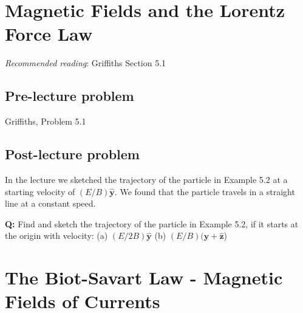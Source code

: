 \documentclass[
  letterpaper,
  DIV=11,
  numbers=noendperiod]{scrreprt}
\begin{document}

\chapter{Magnetic Fields and the Lorentz Force
Law}\label{magnetic-fields-and-the-lorentz-force-law}

\newcommand{\l}{\mathrm{\mathbf{l}}}
\newcommand{\E}{\mathrm{\mathbf{E}}}
\newcommand{\F}{\mathrm{\mathbf{F}}}
\newcommand{\r}{\mathrm{\mathbf{r}}}

\newcommand{\x}{\mathrm{\mathbf{x}}}
\newcommand{\y}{\mathrm{\mathbf{y}}}
\newcommand{\z}{\mathrm{\mathbf{z}}}

\emph{Recommended reading}: Griffiths Section 5.1

\section{Pre-lecture problem}\label{pre-lecture-problem-2}

Griffiths, Problem 5.1

\section{Post-lecture problem}\label{post-lecture-problem-3}

In the lecture we sketched the trajectory of the particle in Example 5.2
at a starting velocity of \((E/B) \hat{\mathrm{\mathbf{y}}}\). We found
that the particle travels in a straight line at a constant speed.

\textbf{Q:} Find and sketch the trajectory of the particle in Example
5.2, if it starts at the origin with velocity: (a)
\((E/2B) \hat{\mathrm{\mathbf{y}}}\) (b)
\((E/B) (\hat{\mathrm{\mathbf{y}}} + \hat{\mathrm{\mathbf{z}}}\))


\chapter{The Biot-Savart Law - Magnetic Fields of
Currents}\label{the-biot-savart-law---magnetic-fields-of-currents}

\newcommand{\l}{\mathrm{\mathbf{l}}}
\newcommand{\E}{\mathrm{\mathbf{E}}}
\newcommand{\F}{\mathrm{\mathbf{F}}}
\newcommand{\r}{\mathrm{\mathbf{r}}}

\newcommand{\x}{\mathrm{\mathbf{x}}}
\newcommand{\y}{\mathrm{\mathbf{y}}}
\newcommand{\z}{\mathrm{\mathbf{z}}}
\end{document}
